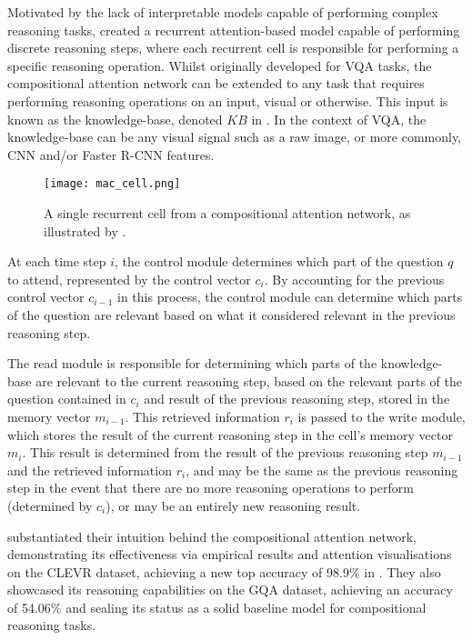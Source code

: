 Motivated by the lack of interpretable models capable of performing complex reasoning tasks, \citeauthor{hudson2018compositional} created a recurrent attention-based model capable of performing discrete reasoning steps, where each recurrent cell is responsible for performing a specific reasoning operation. Whilst originally developed for VQA tasks, the compositional attention network can be extended to any task that requires performing reasoning operations on an input, visual or otherwise. This input is known as the knowledge-base, denoted \(KB\) in \figureautorefname{ \ref{fig:mac_cell}}. In the context of VQA, the knowledge-base can be any visual signal such as a raw image, or more commonly, CNN and/or Faster R-CNN features.

\begin{figure}[htbp]
    \centering
    \texttt{[image: mac\_cell.png]}
    \caption[A recurrent cell from a compositional attention network \cite{hudson2018compositional}]{A single recurrent cell from a compositional attention network, as illustrated by \citeauthor{hudson2018compositional}. \cite{hudson2018compositional}}
    \label{fig:mac_cell}
\end{figure}

At each time step \(i\), the control module determines which part of the question \(q\) to attend, represented by the control vector \(c_i\). By accounting for the previous control vector \(c_{i-1}\) in this process, the control module can determine which parts of the question are relevant based on what it considered relevant in the previous reasoning step.

The read module is responsible for determining which parts of the knowledge-base are relevant to the current reasoning step, based on the relevant parts of the question contained in \(c_i\) and result of the previous reasoning step, stored in the memory vector \(m_{i-1}\). This retrieved information \(r_i\) is passed to the write module, which stores the result of the current reasoning step in the cell's memory vector \(m_i\). This result is determined from the result of the previous reasoning step \(m_{i-1}\) and the retrieved information \(r_i\), and may be the same as the previous reasoning step in the event that there are no more reasoning operations to perform (determined by \(c_i\)), or may be an entirely new reasoning result.

\citeauthor{hudson2018compositional} substantiated their intuition behind the compositional attention network, demonstrating its effectiveness via empirical results and attention visualisations on the CLEVR dataset, achieving a new top accuracy of 98.9\% in \citeyear{hudson2018compositional}. They also showcased its reasoning capabilities on the GQA dataset, achieving an accuracy of 54.06\% and sealing its status as a solid baseline model for compositional reasoning tasks.

